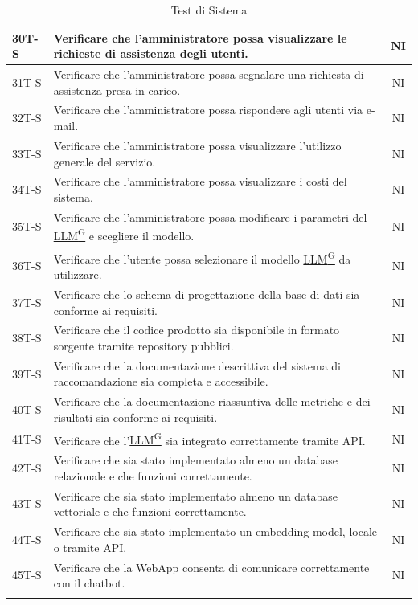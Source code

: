 \documentclass{article}
\begin{document}
\begin{longtable}{|>{\centering\arraybackslash}m{}|>{\raggedright\arraybackslash}m{}|c|}
    \hline
    30T-S & Verificare che l’amministratore possa visualizzare le richieste di assistenza degli utenti. & NI \\
    \hline
    31T-S & Verificare che l’amministratore possa segnalare una richiesta di assistenza presa in carico. & NI \\
    \hline
    32T-S & Verificare che l’amministratore possa rispondere agli utenti via e-mail. & NI \\
    \hline
    33T-S & Verificare che l’amministratore possa visualizzare l’utilizzo generale del servizio. & NI \\
    \hline
    34T-S & Verificare che l’amministratore possa visualizzare i costi del sistema. & NI \\
    \hline
    35T-S & Verificare che l’amministratore possa modificare i parametri del \href{https://code7crusaders.github.io/docs/RTB/documentazione_interna/glossario.html#llm-large-language-model}{LLM\textsuperscript{G}} e scegliere il modello. & NI \\
    \hline
    36T-S & Verificare che l’utente possa selezionare il modello \href{https://code7crusaders.github.io/docs/RTB/documentazione_interna/glossario.html#llm-large-language-model}{LLM\textsuperscript{G}} da utilizzare. & NI \\
    \hline
    37T-S & Verificare che lo schema di progettazione della base di dati sia conforme ai requisiti. & NI \\
    \hline
    38T-S & Verificare che il codice prodotto sia disponibile in formato sorgente tramite repository pubblici. & NI \\
    \hline
    39T-S & Verificare che la documentazione descrittiva del sistema di raccomandazione sia completa e accessibile. & NI \\
    \hline
    40T-S & Verificare che la documentazione riassuntiva delle metriche e dei risultati sia conforme ai requisiti. & NI \\
    \hline
    41T-S & Verificare che l’\href{https://code7crusaders.github.io/docs/RTB/documentazione_interna/glossario.html#llm-large-language-model}{LLM\textsuperscript{G}} sia integrato correttamente tramite API. & NI \\
    \hline
    42T-S & Verificare che sia stato implementato almeno un database relazionale e che funzioni correttamente. & NI \\
    \hline
    43T-S & Verificare che sia stato implementato almeno un database vettoriale e che funzioni correttamente. & NI \\
    \hline
    44T-S & Verificare che sia stato implementato un embedding model, locale o tramite API. & NI \\
    \hline
    45T-S & Verificare che la WebApp consenta di comunicare correttamente con il chatbot. & NI \\
    \hline
\caption{Test di Sistema}
\end{longtable}
\end{document}
